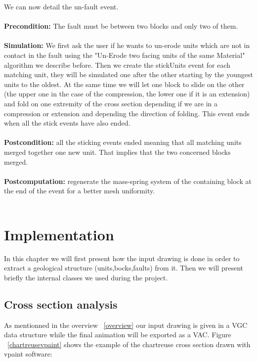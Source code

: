 \documentclass[12pt, a4paper]{report} %
\begin{document}
We can now detail the un-fault event.\\\\
\textbf{Precondition:} The fault must be between two blocks and only two of them.\\\\
\textbf{Simulation:} We first ask the user if he wants to un-erode units which are not in contact in the fault using the "Un-Erode two facing units of the same Material" algorithm we describe before. Then we create the stickUnits event for each matching unit, they will be simulated one after the other starting by the youngest units to the oldest. At the same time we will let one block to slide on the other (the upper one in the case of the compression, the lower one if it is an extension) and fold on one extremity of the cross section depending if we are in a compression or extension and depending the direction of folding. This event ends when all the stick events have also ended.\\\\
\textbf{Postcondition:} all the sticking events ended meaning that all matching units merged together one new unit. That implies that the two concerned blocks merged.\\\\
\textbf{Postcomputation:} regenerate the mass-spring system of the containing block at the end of the event for a better mesh uniformity.\\\\ 
	


 
 
\chapter{Implementation}
 In this chapter we will first present how the input drawing is done in order to extract a geological structure (units,bocks,faults) from it. Then we will present briefly the internal classes we used during the project.
 
\section{Cross section analysis}

As mentionned in the overview ~\ref{overview} our input drawing is given in a VGC data structure while the final animation will be exported as a VAC. 
Figure ~\ref{chartreusevpaint} shows the example of the chartreuse cross section drawn with vpaint software:
\end{document}

